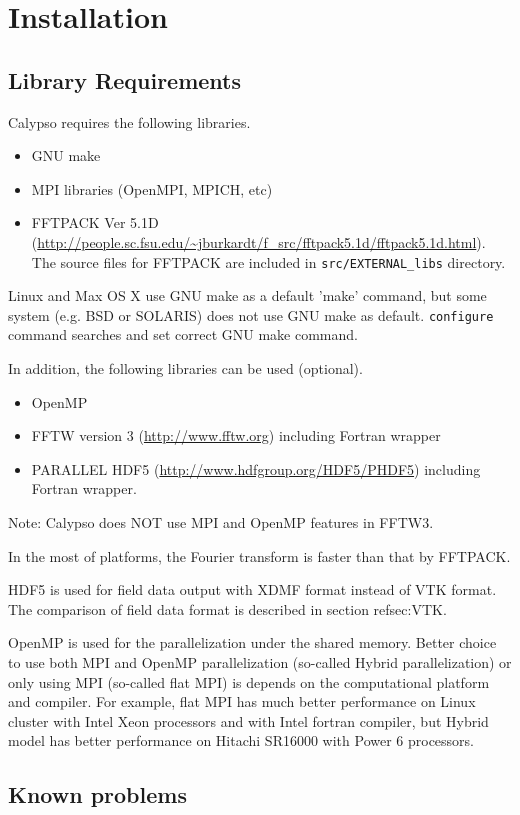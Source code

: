 \newpage
\section{Installation}


\subsection{Library Requirements}
\label{sec:requirements}
Calypso requires the following libraries.
\begin{itemize}
\item GNU make
\item MPI libraries (OpenMPI, MPICH, etc)
\item FFTPACK Ver 5.1D (\url{http://people.sc.fsu.edu/~jburkardt/f_src/fftpack5.1d/fftpack5.1d.html}). The source files for FFTPACK are included in {\tt src/EXTERNAL\_libs} directory.
\end{itemize}
Linux and Max OS X use GNU make as a default 'make' command, but some system (e.g. BSD or SOLARIS) does not use GNU make as default. \verb|configure| command searches and set correct GNU make command.

In addition, the following libraries can be used (optional).
\begin{itemize}
\item OpenMP
\item FFTW version 3 (\url{http://www.fftw.org}) including Fortran wrapper
\item PARALLEL HDF5 (\url{http://www.hdfgroup.org/HDF5/PHDF5})  including Fortran wrapper.
\end{itemize}
Note: Calypso does NOT use MPI and OpenMP features in FFTW3. 

In the most of platforms, the Fourier transform is faster than that by FFTPACK. 

HDF5 is used for field data output with XDMF format instead of VTK format. The comparison of field data format is described in section ref{sec:VTK}. 

OpenMP is used for the parallelization under the shared memory. Better choice to use both MPI and OpenMP parallelization (so-called Hybrid parallelization) or only using MPI (so-called flat MPI) is depends on the computational platform and compiler. For example, flat MPI has much better performance on Linux cluster with Intel Xeon processors and with Intel fortran compiler, but Hybrid model has better performance on Hitachi SR16000 with Power 6 processors.

\subsection{Known problems}
